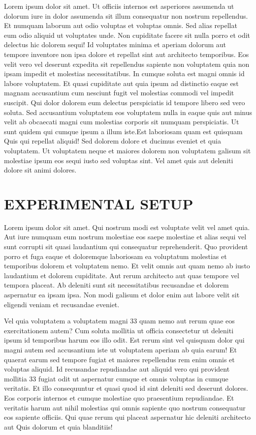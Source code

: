 \documentclass[a4paper,12pt]{report}
\begin{document}
Lorem ipsum dolor sit amet. Ut officiis internos est asperiores assumenda ut dolorum iure in dolor assumenda sit illum consequatur non nostrum repellendus. Et numquam laborum aut odio voluptas et voluptas omnis. Sed alias repellat eum odio aliquid ut voluptates unde. Non cupiditate facere sit nulla porro et odit delectus hic dolorem sequi! Id voluptates minima et aperiam dolorum aut tempore inventore non ipsa dolore et repellat sint aut architecto temporibus. Eos velit vero vel deserunt expedita sit repellendus sapiente non voluptatem quia non ipsam impedit et molestias necessitatibus. In cumque soluta est magni omnis id labore voluptatem. Et quasi cupiditate aut quia ipsum ad distinctio eaque est magnam accusantium cum nesciunt fugit vel molestias commodi vel impedit suscipit. Qui dolor dolorem eum delectus perspiciatis id tempore libero sed vero soluta. Sed accusantium voluptatem eos voluptatem nulla in eaque quis aut minus velit ab obcaecati magni cum molestias corporis sit numquam perspiciatis. Ut sunt quidem qui cumque ipsum a illum iste.Est laboriosam quam est quisquam Quis qui repellat aliquid! Sed dolorem dolore et ducimus eveniet et quia voluptatem. Ut voluptatem neque et maiores dolorem non voluptatem galisum sit molestiae ipsum eos sequi iusto sed voluptas sint. Vel amet quis aut deleniti dolore sit animi dolores.\par

\chapter{EXPERIMENTAL SETUP}
\hspace{.5cm}Lorem ipsum dolor sit amet. Qui nostrum modi est voluptate velit vel amet quia. Aut iure numquam eum nostrum molestiae eos saepe molestiae et alias sequi vel sunt corrupti sit quasi laudantium qui consequatur reprehenderit. Quo provident porro et fuga eaque et doloremque laboriosam ea voluptatum molestias et temporibus dolorem et voluptatem nemo. Et velit omnis aut quam nemo ab iusto laudantium et dolorem cupiditate. Aut rerum architecto aut quas tempore vel tempora placeat. Ab deleniti sunt sit necessitatibus recusandae et dolorem aspernatur ea ipsam ipsa. Non modi galisum et dolor enim aut labore velit sit eligendi veniam et recusandae eveniet.\par
Vel quia voluptatem a voluptatem magni 33 quam nemo aut rerum quae eos exercitationem autem? Cum soluta mollitia ut officia consectetur ut deleniti ipsum id temporibus harum eos illo odit. Est rerum sint vel quisquam dolor qui magni autem sed accusantium iste ut voluptatem aperiam ab quia earum! Et quaerat earum sed tempore fugiat et maiores repellendus rem enim omnis et voluptas aliquid. Id recusandae repudiandae aut aliquid vero qui provident mollitia 33 fugiat odit ut aspernatur cumque et omnis voluptas in cumque veritatis. Et illo consequuntur et quasi quod id sint deleniti sed deserunt dolores. Eos corporis internos et cumque molestiae quo praesentium repudiandae. Et veritatis harum aut nihil molestias qui omnis sapiente quo nostrum consequatur eos sapiente officiis. Qui quae rerum qui placeat aspernatur hic deleniti architecto aut Quis dolorum et quia blanditiis! \par
\end{document}
